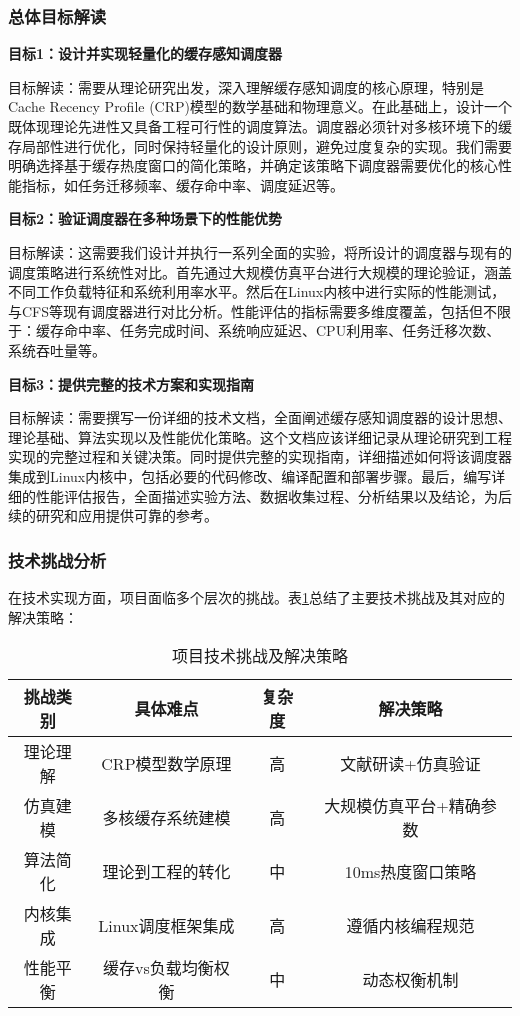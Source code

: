\subsubsection{总体目标解读}

\textbf{目标1：设计并实现轻量化的缓存感知调度器}

目标解读：需要从理论研究出发，深入理解缓存感知调度的核心原理，特别是Cache Recency Profile (CRP)模型的数学基础和物理意义。在此基础上，设计一个既体现理论先进性又具备工程可行性的调度算法。调度器必须针对多核环境下的缓存局部性进行优化，同时保持轻量化的设计原则，避免过度复杂的实现。我们需要明确选择基于缓存热度窗口的简化策略，并确定该策略下调度器需要优化的核心性能指标，如任务迁移频率、缓存命中率、调度延迟等。

\textbf{目标2：验证调度器在多种场景下的性能优势}

目标解读：这需要我们设计并执行一系列全面的实验，将所设计的调度器与现有的调度策略进行系统性对比。首先通过大规模仿真平台进行大规模的理论验证，涵盖不同工作负载特征和系统利用率水平。然后在Linux内核中进行实际的性能测试，与CFS等现有调度器进行对比分析。性能评估的指标需要多维度覆盖，包括但不限于：缓存命中率、任务完成时间、系统响应延迟、CPU利用率、任务迁移次数、系统吞吐量等。

\textbf{目标3：提供完整的技术方案和实现指南}

目标解读：需要撰写一份详细的技术文档，全面阐述缓存感知调度器的设计思想、理论基础、算法实现以及性能优化策略。这个文档应该详细记录从理论研究到工程实现的完整过程和关键决策。同时提供完整的实现指南，详细描述如何将该调度器集成到Linux内核中，包括必要的代码修改、编译配置和部署步骤。最后，编写详细的性能评估报告，全面描述实验方法、数据收集过程、分析结果以及结论，为后续的研究和应用提供可靠的参考。

\subsubsection{技术挑战分析}

在技术实现方面，项目面临多个层次的挑战。表\ref{tab:tech-challenges}总结了主要技术挑战及其对应的解决策略：

\begin{table}[h]
\centering
\begin{tabular}{|c|c|c|c|}
\hline
挑战类别 & 具体难点 & 复杂度 & 解决策略 \\
\hline
理论理解 & CRP模型数学原理 & 高 & 文献研读+仿真验证 \\
仿真建模 & 多核缓存系统建模 & 高 & 大规模仿真平台+精确参数 \\
算法简化 & 理论到工程的转化 & 中 & 10ms热度窗口策略 \\
内核集成 & Linux调度框架集成 & 高 & 遵循内核编程规范 \\
性能平衡 & 缓存vs负载均衡权衡 & 中 & 动态权衡机制 \\
\hline
\end{tabular}
\caption{项目技术挑战及解决策略}
\label{tab:tech-challenges}
\end{table}


